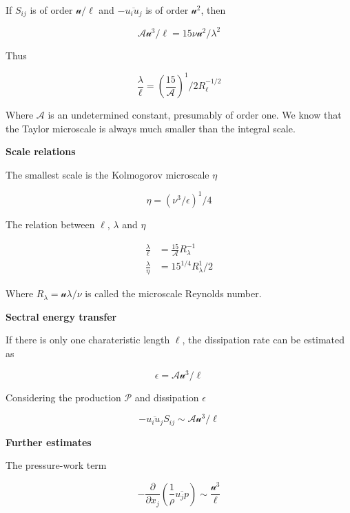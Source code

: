 \documentclass{article}
\begin{document}
If $S_{ij}$ is of order $\mathcal{u}/\ell$ and $-\overline{u_i u_j}$ is of order $\mathcal{u}^2$, then

\begin{equation*}
    \mathcal{A}\mathcal{u}^3/\ell=15\nu\mathcal{u}^2/\lambda^2
\end{equation*}

Thus

\begin{equation*}
    \frac{\lambda}{\ell}=\left(\frac{15}{\mathcal{A}}\right)^1/2 R_\ell^{-1/2}
\end{equation*}

Where $\mathcal{A}$ is an undetermined constant, presumably of order one. We know that the Taylor microscale is always much smaller than the integral scale.

\textbf{Scale relations}

The smallest scale is the Kolmogorov microscale $\eta$

\begin{equation*}
    \eta=(\nu^3/\epsilon)^1/4
\end{equation*}

The relation between $\ell$, $\lambda$ and $\eta$

\begin{align*}
    \frac{\lambda}{\ell}&=\frac{15}{\mathcal{A}}R_\lambda^{-1}\\
    \frac{\lambda}{\eta}&=15^{1/4}R_\lambda^1/2
\end{align*}

Where $R_\lambda=\mathcal{u}\lambda/\nu$ is called the microscale Reynolds number.

\textbf{Sectral energy transfer}

If there is only one charateristic length $\ell$, the dissipation rate can be estimated as

\begin{equation*}
    \epsilon=\mathcal{A}\mathcal{u}^3/\ell
\end{equation*}

Considering the production $\mathcal{P}$ and dissipation $\epsilon$

\begin{equation*}
    -\overline{u_iu_j}S_{ij}\sim\mathcal{A}\mathcal{u}^3/\ell
\end{equation*}

\textbf{Further estimates}

The pressure-work term

\begin{equation*}
    -\frac{\partial}{\partial x_j}\left(\frac{1}{\rho}\overline{u_j p}\right)\sim\frac{\mathcal{u}^3}{\ell}
\end{equation*}
\end{document}
